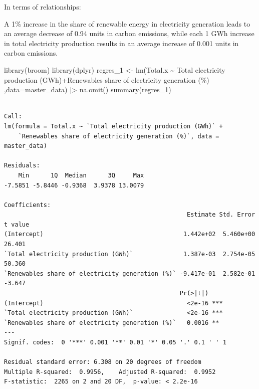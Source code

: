 \documentclass[
  letterpaper,
  DIV=11,
  numbers=noendperiod]{scrartcl}
\newenvironment{Shaded}{\begin{snugshade}}{\end{snugshade}}
\newcommand{\AttributeTok}[1]{\textcolor[rgb]{0.40,0.45,0.13}{#1}}
\newcommand{\FunctionTok}[1]{\textcolor[rgb]{0.28,0.35,0.67}{#1}}
\newcommand{\NormalTok}[1]{\textcolor[rgb]{0.00,0.23,0.31}{#1}}
\newcommand{\OtherTok}[1]{\textcolor[rgb]{0.00,0.23,0.31}{#1}}
\newcommand{\SpecialCharTok}[1]{\textcolor[rgb]{0.37,0.37,0.37}{#1}}
\newcommand{\StringTok}[1]{\textcolor[rgb]{0.13,0.47,0.30}{#1}}
\begin{document}
In terms of relationships:

A 1\% increase in the share of renewable energy in electricity
generation leads to an average decrease of 0.94 units in carbon
emissions, while each 1 GWh increase in total electricity production
results in an average increase of 0.001 units in carbon emissions.

\begin{Shaded}
\begin{Highlighting}[]
\FunctionTok{library}\NormalTok{(broom)}
\FunctionTok{library}\NormalTok{(dplyr)}
\NormalTok{regres\_1 }\OtherTok{\textless{}{-}} \FunctionTok{lm}\NormalTok{(Total.x }\SpecialCharTok{\textasciitilde{}} \StringTok{\textasciigrave{}}\AttributeTok{Total electricity production (GWh)}\StringTok{\textasciigrave{}}\SpecialCharTok{+}\StringTok{\textasciigrave{}}\AttributeTok{Renewables share of electricity generation (\%)}\StringTok{\textasciigrave{}}\NormalTok{ ,}\AttributeTok{data=}\NormalTok{master\_data) }\SpecialCharTok{|\textgreater{}} \FunctionTok{na.omit}\NormalTok{()}
\FunctionTok{summary}\NormalTok{(regres\_1)}
\end{Highlighting}
\end{Shaded}

\begin{verbatim}

Call:
lm(formula = Total.x ~ `Total electricity production (GWh)` + 
    `Renewables share of electricity generation (%)`, data = master_data)

Residuals:
    Min      1Q  Median      3Q     Max 
-7.5851 -5.8446 -0.9368  3.9378 13.0079 

Coefficients:
                                                   Estimate Std. Error t value
(Intercept)                                       1.442e+02  5.460e+00  26.401
`Total electricity production (GWh)`              1.387e-03  2.754e-05  50.360
`Renewables share of electricity generation (%)` -9.417e-01  2.582e-01  -3.647
                                                 Pr(>|t|)    
(Intercept)                                        <2e-16 ***
`Total electricity production (GWh)`               <2e-16 ***
`Renewables share of electricity generation (%)`   0.0016 ** 
---
Signif. codes:  0 '***' 0.001 '**' 0.01 '*' 0.05 '.' 0.1 ' ' 1

Residual standard error: 6.308 on 20 degrees of freedom
Multiple R-squared:  0.9956,    Adjusted R-squared:  0.9952 
F-statistic:  2265 on 2 and 20 DF,  p-value: < 2.2e-16
\end{verbatim}
\end{document}

